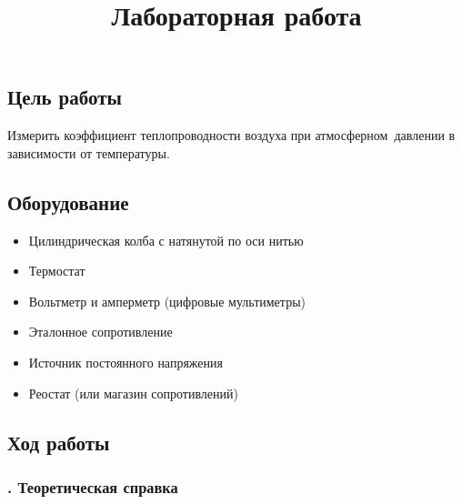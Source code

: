 \documentclass[a4paper, 12pt]{article}
\title{
  Лабораторная работа \textnumero \\
  \textbf{\textquote{\unskip}}
}
\author{}
\date{}
\begin{document}
\maketitle\thispagestyle{fancy}

\subsection*{Цель работы}
Измерить коэффициент теплопроводности воздуха при атмосферном\
давлении в зависимости от температуры.

\subsection*{Оборудование}
\begin{itemize}[noitemsep]
  \item Цилиндрическая колба с натянутой по оси нитью
  \item Термостат
  \item Вольтметр и амперметр (цифровые мультиметры)
  \item Эталонное сопротивление
  \item Источник постоянного напряжения
  \item Реостат (или магазин сопротивлений)
\end{itemize}

\subsection*{{Ход работы}}
\subsubsection*{. Теоретическая справка}
\end{document}
